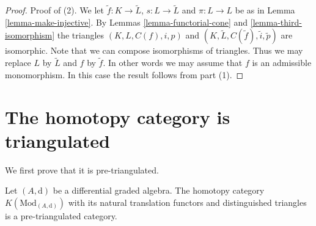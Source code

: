 \begin{proof}
\medskip\noindent
Proof of (2). We let $\tilde f : K \to \tilde L$,
$s : L \to \tilde L$
and $\pi : L \to L$ be as in
Lemma \ref{lemma-make-injective}. By
Lemmas \ref{lemma-functorial-cone} and \ref{lemma-third-isomorphism}
the triangles $(K, L, C(f), i, p)$ and
$(K, \tilde L, C(\tilde f), \tilde i, \tilde p)$
are isomorphic. Note that we can compose isomorphisms of
triangles. Thus we may replace $L$ by
$\tilde L$ and $f$ by $\tilde f$. In other words
we may assume that $f$ is an admissible monomorphism.
In this case the result follows from part (1).
\end{proof}







\section{The homotopy category is triangulated}
\label{section-homotopy-triangulated}

\noindent
We first prove that it is pre-triangulated.

\begin{lemma}
\label{lemma-homotopy-category-pre-triangulated}
Let $(A, \text{d})$ be a differential graded algebra.
The homotopy category $K(\text{Mod}_{(A, \text{d})})$
with its natural translation functors and distinguished triangles
is a pre-triangulated category.
\end{lemma}


